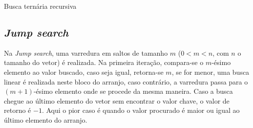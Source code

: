 \begin{algorithm}[H]
  \DontPrintSemicolon
  \SetAlgoLined
  \caption{Busca ternária recursiva}

  \BlankLine
  
\end{algorithm}


\subsection{{\it Jump search}}

Na {\it Jump search}, uma varredura em saltos de tamanho $m$ ($0< m < n$, com $n$ o tamanho do vetor) é realizada. Na primeira iteração, compara-se o $m$-ésimo elemento ao valor buscado, caso seja igual, retorna-se $m$, se for menor, uma busca linear é realizada neste bloco do arranjo, caso contrário, a varredura passa para o $(m+1)$-ésimo elemento onde se procede da mesma maneira. Caso a busca chegue ao último elemento do vetor sem encontrar o valor chave, o valor de retorno é $-1$. Aqui o pior caso é quando o valor procurado é maior ou igual ao último elemento do arranjo.

